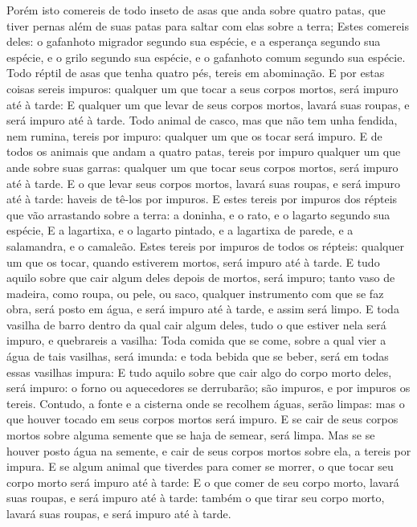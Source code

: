 {{  Porém isto comereis de todo inseto de asas que anda sobre quatro patas, que tiver pernas além de suas patas para saltar com elas sobre a terra;
  Estes comereis deles: o gafanhoto migrador segundo sua espécie, e a esperança segundo sua espécie, e o grilo segundo sua espécie, e o gafanhoto comum segundo sua espécie.
  Todo réptil de asas que tenha quatro pés, tereis em abominação.
  E por estas coisas sereis impuros: qualquer um que tocar a seus corpos mortos, será impuro até à tarde:
  E qualquer um que levar de seus corpos mortos, lavará suas roupas, e será impuro até à tarde.
  Todo animal de casco, mas que não tem unha fendida, nem rumina, tereis por impuro: qualquer um que os tocar será impuro.
  E de todos os animais que andam a quatro patas, tereis por impuro qualquer um que ande sobre suas garras: qualquer um que tocar seus corpos mortos, será impuro até à tarde.
  E o que levar seus corpos mortos, lavará suas roupas, e será impuro até à tarde: haveis de tê-los por impuros.
  E estes tereis por impuros dos répteis que vão arrastando sobre a terra: a doninha, e o rato, e o lagarto segundo sua espécie,
  E a lagartixa, e o lagarto pintado, e a lagartixa de parede, e a salamandra, e o camaleão.
  Estes tereis por impuros de todos os répteis: qualquer um que os tocar, quando estiverem mortos, será impuro até à tarde.
  E tudo aquilo sobre que cair algum deles depois de mortos, será impuro; tanto vaso de madeira, como roupa, ou pele, ou saco, qualquer instrumento com que se faz obra, será posto em água, e será impuro até à tarde, e assim será limpo.
  E toda vasilha de barro dentro da qual cair algum deles, tudo o que estiver nela será impuro, e quebrareis a vasilha:
  Toda comida que se come, sobre a qual vier a água de tais vasilhas, será imunda: e toda bebida que se beber, será em todas essas vasilhas impura:
  E tudo aquilo sobre que cair algo do corpo morto deles, será impuro: o forno ou aquecedores se derrubarão; são impuros, e por impuros os tereis.
  Contudo, a fonte e a cisterna onde se recolhem águas, serão limpas: mas o que houver tocado em seus corpos mortos será impuro.
  E se cair de seus corpos mortos sobre alguma semente que se haja de semear, será limpa.
  Mas se se houver posto água na semente, e cair de seus corpos mortos sobre ela, a tereis por impura.
  E se algum animal que tiverdes para comer se morrer, o que tocar seu corpo morto será impuro até à tarde:
  E o que comer de seu corpo morto, lavará suas roupas, e será impuro até à tarde: também o que tirar seu corpo morto, lavará suas roupas, e será impuro até à tarde.
}}
